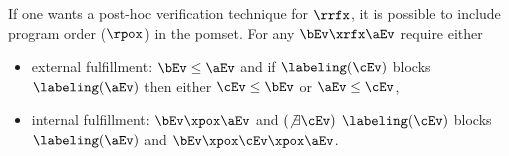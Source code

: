 If one wants a post-hoc verification technique for $\rrfx$, it is possible to
include program order ($\rpox$) in the pomset.  For any $\bEv\xrfx\aEv$ require either
\begin{itemize}
\item external fulfillment: $\bEv\le\aEv$ and if $\labeling(\cEv)$ blocks
  $\labeling(\aEv)$ then either $\cEv\le\bEv$ or $\aEv\le\cEv$,
\item internal fulfillment: $\bEv\xpox\aEv$ and $(\not\exists\cEv)$
  $\labeling(\cEv)$ blocks $\labeling(\aEv)$ and
  $\bEv\xpox\cEv\xpox\aEv$.
\end{itemize}




